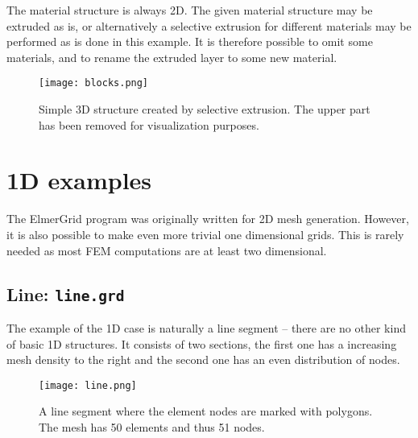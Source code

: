 The material
structure is always 2D. 
The given material structure may be 
extruded as is, or alternatively a selective extrusion for
different materials may be performed as is done in this example.
It is therefore possible to omit some materials, and to rename 
the extruded layer to some new material.

\begin{figure}
\begin{center}
\texttt{[image: blocks.png]}
\end{center}
\caption{Simple 3D structure created by selective extrusion. 
	The upper part has been removed for visualization purposes.}
\label{pic12}
\end{figure}




\section{1D examples}

The ElmerGrid program was originally written for 2D mesh generation. 
However, it is also possible to make even more trivial one dimensional grids.
This is rarely needed as most FEM computations are at least two dimensional.

\subsection*{Line: \texttt{line.grd}}

The example of the 1D case is naturally a line segment -- there are no other kind of basic 1D structures.
It consists of two sections, the first one has a increasing mesh density to the right and the second one
has an even distribution of nodes.


\begin{figure}
\begin{center}
\texttt{[image: line.png]} 
\end{center}
\caption{A line segment where the element nodes are marked with polygons.
The mesh has 50 elements and thus 51 nodes.}
\label{pic8b}
\end{figure}
